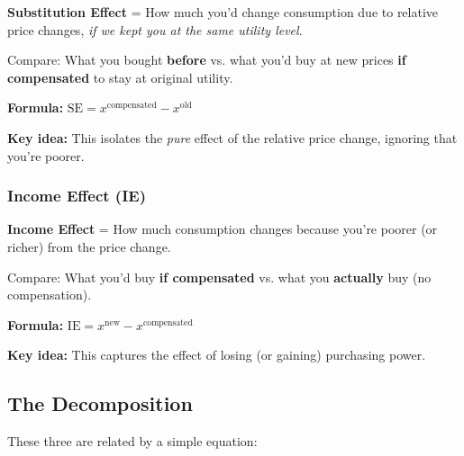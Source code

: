 \documentclass[11pt]{article}
\begin{document}
\begin{center}
\colorbox{yellow!30}{
\begin{minipage}{0.9\textwidth}
\textbf{Substitution Effect} = How much you'd change consumption due to relative price changes, \textit{if we kept you at the same utility level}.

\vspace{0.5em}

Compare: What you bought \textbf{before} vs. what you'd buy at new prices \textbf{if compensated} to stay at original utility.
\end{minipage}
}
\end{center}

\textbf{Formula:} $\text{SE} = x^{\text{compensated}} - x^{\text{old}}$

\textbf{Key idea:} This isolates the \textit{pure} effect of the relative price change, ignoring that you're poorer.

\subsubsection{Income Effect (IE)}

\begin{center}
\colorbox{yellow!30}{
\begin{minipage}{0.9\textwidth}
\textbf{Income Effect} = How much consumption changes because you're poorer (or richer) from the price change.

\vspace{0.5em}

Compare: What you'd buy \textbf{if compensated} vs. what you \textbf{actually} buy (no compensation).
\end{minipage}
}
\end{center}

\textbf{Formula:} $\text{IE} = x^{\text{new}} - x^{\text{compensated}}$

\textbf{Key idea:} This captures the effect of losing (or gaining) purchasing power.

\subsection{The Decomposition}

These three are related by a simple equation:

\begin{center}
\Large
{}
\end{center}
\end{document}
